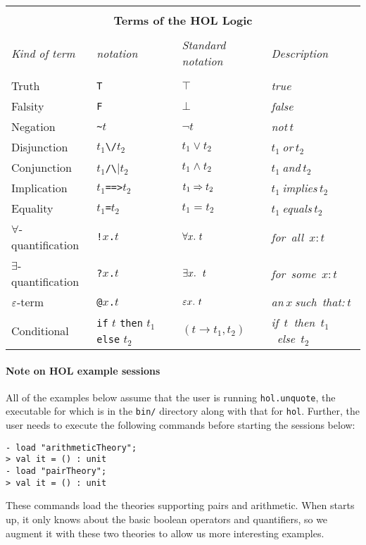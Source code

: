 \begin{center}
\begin{tabular}{|l|l|l|l|} \hline
\multicolumn{4}{|c|}{ } \\
\multicolumn{4}{|c|}{\bf Terms of the HOL Logic} \\
\multicolumn{4}{|c|}{ } \\
{\it Kind of term} & {\it \HOL{} notation} &
{\it Standard notation} &
{\it Description} \\ \hline
 & & & \\
Truth & {\small\verb|T|} & $\top$ & {\it true}\\ \hline
Falsity & {\small\verb|F|} & $\bot$ & {\it false}\\ \hline
Negation & {\small\verb|~|}$t$ & $\neg t$ & {\it not}$\ t$\\ \hline
Disjunction & $t_1${\small\verb|\/|}$t_2$ & $t_1\vee t_2$ &
$t_1\ ${\it or}$\ t_2$ \\ \hline
Conjunction & $t_1${\small\verb|/\|}$t_2$ & $t_1\wedge t_2$ &
$t_1\ ${\it and}$\ t_2$ \\ \hline
Implication & $t_1${\small\verb|==>|}$t_2$ & $t_1\Rightarrow t_2$ &
$t_1\ ${\it implies}$\ t_2$ \\ \hline
Equality & $t_1${\small\verb|=|}$t_2$ & $t_1 = t_2$ &
$t_1\ ${\it equals}$\ t_2$ \\ \hline
$\forall$-quantification & {\small\verb|!|}$x${\small\verb|.|}$t$ &
$\forall x.\ t$ & {\it for\ all\ }$x: t$ \\ \hline
$\exists$-quantification & {\small\verb|?|}$x${\small\verb|.|}$t$ &
$\equant{x}\ t$ & {\it for\ some\ }$x: t$ \\ \hline
$\varepsilon$-term & {\small\verb|@|}$x${\small\verb|.|}$t$ &
$\varepsilon x.\ t$ & {\it an}$\ x\ ${\it such\ that:}$\ t$ \\ \hline
Conditional & {\small\verb|if|} $t$ {\small\verb|then|} $t_1$
              {\small\verb|else|} $t_2$ &
$(t\rightarrow t_1, t_2)$ & {\it if\ }$t${\it \ then\ }$t_1${\it\ else\ }$t_2$
 \\ \hline
\end{tabular}
\end{center}\label{logic-table}

\paragraph{Note on HOL example sessions}
All of the examples below assume that the user is running
\texttt{hol.unquote}, the executable for which is in the \texttt{bin/}
directory along with that for \texttt{hol}.  Further, the user needs
to execute the following commands before starting the sessions below:
\setcounter{sessioncount}{0}
\begin{session}
\begin{verbatim}
- load "arithmeticTheory";
> val it = () : unit
- load "pairTheory";
> val it = () : unit
\end{verbatim}
\end{session}
\noindent These commands load the \HOL{} theories supporting pairs and
arithmetic.  When \HOL{} starts up, it only knows about the basic
boolean operators and quantifiers, so we augment it with these two
theories to allow us more interesting examples.
\bigskip

